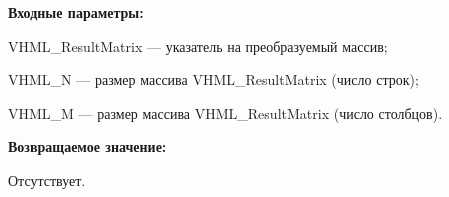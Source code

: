 \textbf{Входные параметры:}

 VHML\_ResultMatrix --- указатель на преобразуемый массив;
 
 VHML\_N --- размер массива VHML\_ResultMatrix (число строк);
 
 VHML\_M --- размер массива VHML\_ResultMatrix (число столбцов).

\textbf{Возвращаемое значение:}

 Отсутствует.